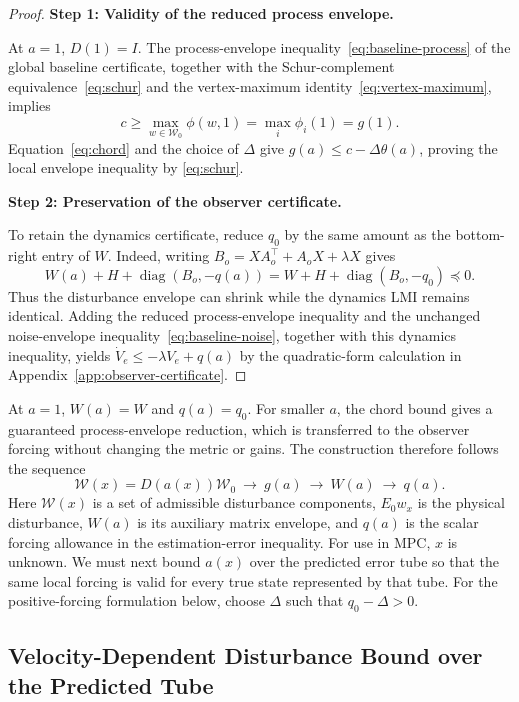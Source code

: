 \documentclass[11pt,a4paper]{article}
\numberwithin{equation}{section}
\theoremstyle{remark}\newtheorem{remark}{Remark}
\newcommand{\diag}{\operatorname{diag}}
\newcommand{\cW}{\mathcal W}
\begin{document}
\begin{proof}
\leavevmode\par\smallskip\noindent\textbf{Step 1: Validity of the reduced process envelope.}\par\nobreak\smallskip\noindent
At $a=1$, $D(1)=I$. The process-envelope inequality~\eqref{eq:baseline-process} of the global baseline certificate, together with the Schur-complement equivalence~\eqref{eq:schur} and the vertex-maximum identity~\eqref{eq:vertex-maximum}, implies
\[
c\ge\max_{w\in\cW_0}\phi(w,1)=\max_i\phi_i(1)=g(1).
\]
Equation~\eqref{eq:chord} and the choice of $\Delta$ give $g(a)\le c-\Delta\theta(a)$, proving the local envelope inequality by \eqref{eq:schur}. \par\medskip\noindent\textbf{Step 2: Preservation of the observer certificate.}\par\nobreak\smallskip\noindent
To retain the dynamics certificate, reduce $q_0$ by the same amount as the bottom-right entry of $W$. Indeed, writing $B_o=XA_o^\top+A_oX+\lambda X$ gives
\[
W(a)+H+\diag(B_o,-q(a))
=W+H+\diag(B_o,-q_0)\preceq0.
\]
Thus the disturbance envelope can shrink while the dynamics LMI remains identical. Adding the reduced process-envelope inequality and the unchanged noise-envelope inequality~\eqref{eq:baseline-noise}, together with this dynamics inequality, yields $\dot V_e\le-\lambda V_e+q(a)$ by the quadratic-form calculation in Appendix~\ref{app:observer-certificate}.
\end{proof}
At $a=1$, $W(a)=W$ and $q(a)=q_0$. For smaller $a$, the chord bound gives a guaranteed process-envelope reduction, which is transferred to the observer forcing without changing the metric or gains. The construction therefore follows the sequence
\[
\mathcal W(x)=D(a(x))\cW_0
\ \longrightarrow\ g(a)\ \longrightarrow\ W(a)\ \longrightarrow\ q(a).
\]
Here $\mathcal W(x)$ is a set of admissible disturbance components, $E_0w_x$ is the physical disturbance, $W(a)$ is its auxiliary matrix envelope, and $q(a)$ is the scalar forcing allowance in the estimation-error inequality. For use in MPC, $x$ is unknown. We must next bound $a(x)$ over the predicted error tube so that the same local forcing is valid for every true state represented by that tube. For the positive-forcing formulation below, choose $\Delta$ such that $q_0-\Delta>0$.
\subsection{Velocity-Dependent Disturbance Bound over the Predicted Tube}\label{sec:velocity-envelope}
\end{document}

